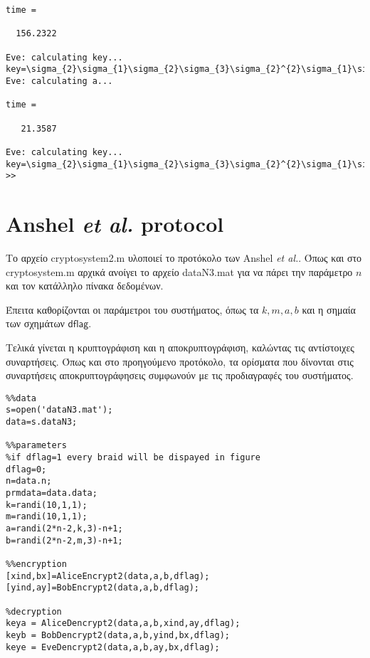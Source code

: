 \documentclass[a4paper,11pt]{article}
\newcommand\ntext[1]{\ensuremath{\mathsf{#1}}}
\begin{document}
\begin{lstlisting}
time =

  156.2322

Eve: calculating key...
key=\sigma_{2}\sigma_{1}\sigma_{2}\sigma_{3}\sigma_{2}^{2}\sigma_{1}\sigma_{3}\sigma_{2}\sigma_{1}^{2}\sigma_{2}\sigma_{1}^{2}\sigma_{2}\sigma_{3}\sigma_{1}\sigma_{3}\sigma_{2}\sigma_{1}\sigma_{2}^{2}\sigma_{1}\sigma_{2}\sigma_{3}\sigma_{2}^{2}\sigma_{1}^{2}\sigma_{2}^{2}\sigma_{1}^{2}\sigma_{2}\sigma_{3}^{5}
Eve: calculating a...

time =

   21.3587

Eve: calculating key...
key=\sigma_{2}\sigma_{1}\sigma_{2}\sigma_{3}\sigma_{2}^{2}\sigma_{1}\sigma_{3}\sigma_{2}\sigma_{1}^{2}\sigma_{2}\sigma_{1}^{2}\sigma_{2}\sigma_{3}\sigma_{1}\sigma_{3}\sigma_{2}\sigma_{1}\sigma_{2}^{2}\sigma_{1}\sigma_{2}\sigma_{3}\sigma_{2}^{2}\sigma_{1}^{2}\sigma_{2}^{2}\sigma_{1}^{2}\sigma_{2}\sigma_{3}^{5}
>> \end{lstlisting}

\section{Anshel \textit{et al.} protocol}

Το αρχείο cryptosystem2.m υλοποιεί το προτόκολο των Anshel \textit{et al.}. Όπως και στο cryptosystem.m αρχικά ανοίγει το αρχείο dataN3.mat για να πάρει την παράμετρο $ n $ και τον κατάλληλο πίνακα δεδομένων.

Έπειτα καθορίζονται οι παράμετροι του συστήματος, όπως τα $ k,m,a,b $ και η σημαία των σχημάτων \ntext{dflag}.

Τελικά γίνεται η κρυπτογράφιση και η αποκρυπτογράφιση, καλώντας τις αντίστοιχες συναρτήσεις. Όπως και στο προηγούμενο προτόκολο, τα ορίσματα που δίνονται στις συναρτήσεις αποκρυπτογράφησεις συμφωνούν με τις προδιαγραφές του συστήματος.  
\begin{lstlisting}
%%data
s=open('dataN3.mat');
data=s.dataN3;

%%parameters
%if dflag=1 every braid will be dispayed in figure
dflag=0;
n=data.n;
prmdata=data.data;
k=randi(10,1,1);
m=randi(10,1,1);
a=randi(2*n-2,k,3)-n+1;
b=randi(2*n-2,m,3)-n+1;

%%encryption
[xind,bx]=AliceEncrypt2(data,a,b,dflag);
[yind,ay]=BobEncrypt2(data,a,b,dflag);

%decryption
keya = AliceDencrypt2(data,a,b,xind,ay,dflag);
keyb = BobDencrypt2(data,a,b,yind,bx,dflag);
keye = EveDencrypt2(data,a,b,ay,bx,dflag);
\end{lstlisting}
\end{document}
